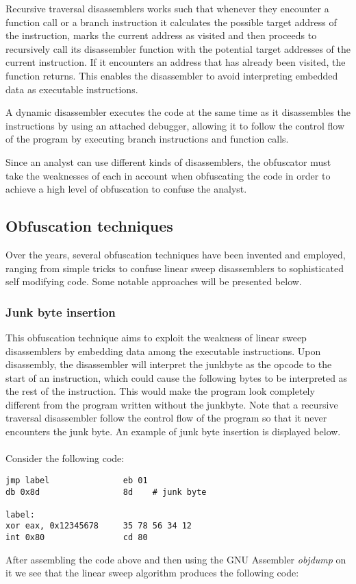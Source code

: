 \documentclass[11pt,twoside]{eitExjobb}
\begin{document}
Recursive traversal disassemblers works such that whenever they encounter a function call or a branch instruction it calculates the possible target address of the instruction, marks the current address as visited and then proceeds to recursively call its disassembler function with the potential target addresses of the current instruction. If it encounters an address that has already been visited, the function returns. This enables the disassembler to avoid interpreting embedded data as executable instructions.

A dynamic disassembler executes the code at the same time as it disassembles the instructions by using an attached debugger, allowing it to follow the control flow of the program by executing branch instructions and function calls. 

Since an analyst can use different kinds of disassemblers, the obfuscator must take the weaknesses of each in account when obfuscating the code in order to achieve a high level of obfuscation to confuse the analyst.

\subsection{Obfuscation techniques}
Over the years, several obfuscation techniques have been invented and employed, ranging from simple tricks to confuse linear sweep disassemblers to sophisticated self modifying code. Some notable approaches will be presented below.

\subsubsection{Junk byte insertion}
This obfuscation technique aims to exploit the weakness of linear sweep disassemblers by embedding data among the executable instructions. Upon disassembly, the disassembler will interpret the junkbyte as the opcode to the start of an instruction, which could cause the following bytes to be interpreted as the rest of the instruction. This would make the program look completely different from the program written without the junkbyte. Note that a recursive traversal disassembler follow the control flow of the program so that it never encounters the junk byte. An example of junk byte insertion is displayed below.\cite{instructionoverlapping}
\\
\\
Consider the following code:
\begin{verbatim}
jmp label               eb 01
db 0x8d                 8d    # junk byte

label:
xor eax, 0x12345678     35 78 56 34 12
int 0x80                cd 80
\end{verbatim}
\noindent After assembling the code above and then using the GNU Assembler \emph{objdump}\cite{objdump} on it we see that the linear sweep algorithm produces the following code:
\end{document}
